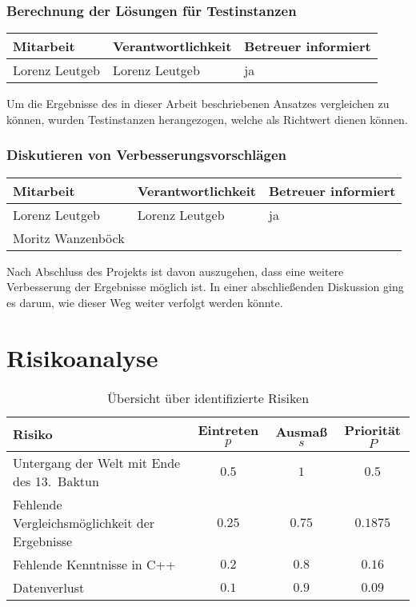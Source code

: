 \subsubsection{ Berechnung der Lösungen für Testinstanzen}

\begin{center}
\begin{tabular}{lll}
	Mitarbeit & Verantwortlichkeit & Betreuer informiert \\
	\hline
	Lorenz Leutgeb & Lorenz Leutgeb & ja \\
\end{tabular}
\end{center}

Um die Ergebnisse des in dieser Arbeit beschriebenen Ansatzes vergleichen zu können, wurden Testinstanzen herangezogen, welche als Richtwert dienen können.

\subsubsection{ Diskutieren von Verbesserungsvorschlägen}

\begin{center}
\begin{tabular}{lll}
	Mitarbeit & Verantwortlichkeit & Betreuer informiert \\
	\hline
	Lorenz Leutgeb & Lorenz Leutgeb & ja \\
	Moritz Wanzenböck & & \\
\end{tabular}
\end{center}

Nach Abschluss des Projekts ist davon auszugehen, dass eine weitere Verbesserung der Ergebnisse möglich ist. In einer abschließenden Diskussion ging es darum, wie dieser Weg weiter verfolgt werden könnte.

\section{Risikoanalyse}
\begin{table}
\centering
\begin{tabular}{lccc}
Risiko & Eintreten $p$ & Ausmaß $s$ & Priorität $P$\\
\hline
Untergang der Welt mit Ende des 13.\ Baktun & $0.5$ & $1$ & $0.5$\\
Fehlende Vergleichsmöglichkeit der Ergebnisse & $0.25$ & $0.75$ & $0.1875$ \\
Fehlende Kenntnisse in C++ & $0.2$ & $0.8$ & $0.16$ \\
Datenverlust & $0.1$ & $0.9$ & $0.09$ \\
\end{tabular}
\caption{Übersicht über identifizierte Risiken}
\label{tab:risk}
\end{table}

